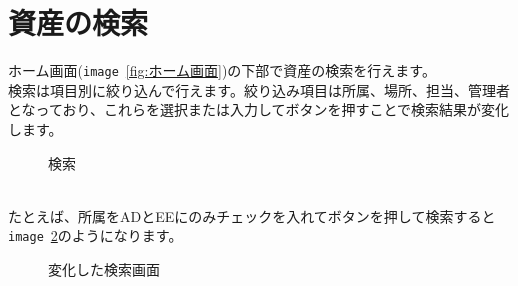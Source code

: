 \documentclass[11ptm]{jsarticle}
\begin{document}
\section{資産の検索}
\label{sec:資産の検索}
ホーム画面({\tt image}\ \ref{fig:ホーム画面})の下部で資産の検索を行えます。\\
検索は項目別に絞り込んで行えます。絞り込み項目は所属、場所、担当、管理者となっており、これらを選択または入力してボタンを押すことで検索結果が変化します。
\begin{figure}[h]
  \centering
  \caption{\label{fig:検索}検索}
\end{figure}\\
たとえば、所属をADとEEにのみチェックを入れてボタンを押して検索すると{\tt image}\ \ref{fig:変化した検索画面}のようになります。
\begin{figure}[h]
  \centering
  \caption{\label{fig:変化した検索画面}変化した検索画面}
\end{figure}


\clearpage
\end{document}

